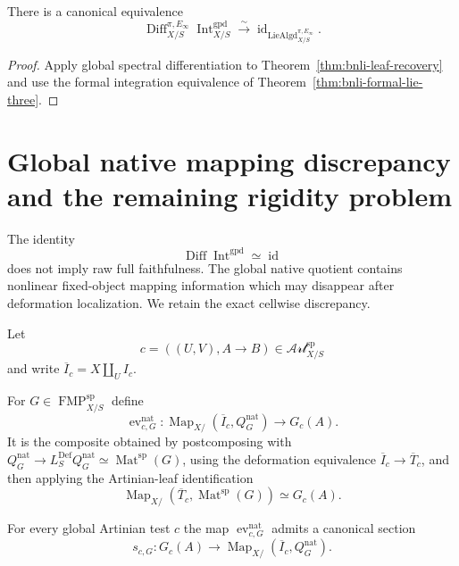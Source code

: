 \begin{corollary}
\label{cor:bnli-diff-int-identity}
There is a canonical equivalence
\[
\boxed{
    \operatorname{Diff}^{\pi,E_\infty}_{X/S}
    \operatorname{Int}^{\mathrm{gpd}}_{X/S}
    \xrightarrow{\sim}
    \operatorname{id}_{
      \operatorname{LieAlgd}^{\pi,E_\infty}_{X/S}}.}
\]
\end{corollary}

\begin{proof}
Apply global spectral differentiation to
Theorem~\ref{thm:bnli-leaf-recovery} and use the formal integration
equivalence of Theorem~\ref{thm:bnli-formal-lie-three}.
\end{proof}

\section{Global native mapping discrepancy and the remaining rigidity problem}
\label{sec:bnli-native-density}

The identity
\[
    \operatorname{Diff}
    \operatorname{Int}^{\mathrm{gpd}}
    \simeq
    \operatorname{id}
\]
does not imply raw full faithfulness.  The global native quotient contains
nonlinear fixed-object mapping information which may disappear after
deformation localization.  We retain the exact cellwise discrepancy.

Let
\[
    c=((U,V),A\to B)
    \in\mathscr{Art}^{\mathrm{sp}}_{X/S}
\]
and write $\overline I_c=X\amalg_UI_c$.

\begin{definition}
\label{def:bnli-global-native-evaluation}
For
$G\in\operatorname{FMP}^{\mathrm{sp}}_{X/S}$ define
\[
\boxed{
    \operatorname{ev}^{\mathrm{nat}}_{c,G}:
    \operatorname{Map}_{X/}(\overline I_c,Q_G^{\mathrm{nat}})
    \longrightarrow
    G_c(A).}
\]
It is the composite obtained by postcomposing with
$Q_G^{\mathrm{nat}}\to L_S^{\mathrm{Def}}Q_G^{\mathrm{nat}}\simeq
\operatorname{Mat}^{\mathrm{sp}}(G)$, using the deformation equivalence
$\overline I_c\to\overline T_c$, and then applying the Artinian-leaf
identification
\[
    \operatorname{Map}_{X/}
    (\overline T_c,\operatorname{Mat}^{\mathrm{sp}}(G))
    \simeq G_c(A).
\]
\end{definition}

\begin{proposition}
\label{prop:bnli-native-evaluation-section}
For every global Artinian test $c$ the map
$\operatorname{ev}^{\mathrm{nat}}_{c,G}$ admits a canonical section
\[
\boxed{
    s_{c,G}:
    G_c(A)
    \longrightarrow
    \operatorname{Map}_{X/}(\overline I_c,Q_G^{\mathrm{nat}}).}
\]
\end{proposition}

